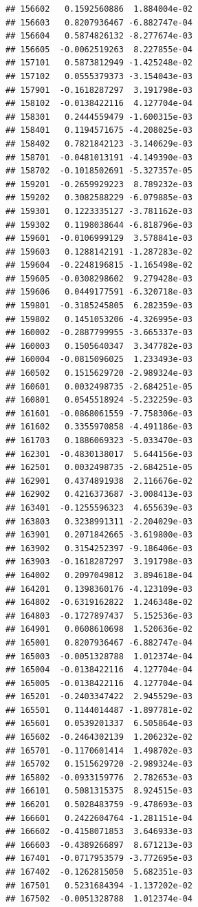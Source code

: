 \begin{frame}[fragile]
\begin{verbatim}
## 156602   0.1592560886  1.884004e-02
## 156603   0.8207936467 -6.882747e-04
## 156604   0.5874826132 -8.277674e-03
## 156605  -0.0062519263  8.227855e-04
## 157101   0.5873812949 -1.425248e-02
## 157102   0.0555379373 -3.154043e-03
## 157901  -0.1618287297  3.191798e-03
## 158102  -0.0138422116  4.127704e-04
## 158301   0.2444559479 -1.600315e-03
## 158401   0.1194571675 -4.208025e-03
## 158402   0.7821842123 -3.140629e-03
## 158701  -0.0481013191 -4.149390e-03
## 158702  -0.1018502691 -5.327357e-05
## 159201  -0.2659929223  8.789232e-03
## 159202   0.3082588229 -6.079885e-03
## 159301   0.1223335127 -3.781162e-03
## 159302   0.1198038644 -6.818796e-03
## 159601  -0.0106999129  3.578841e-03
## 159603   0.1288142191 -1.287283e-02
## 159604  -0.2248196815 -1.165498e-02
## 159605  -0.0308298602  9.279428e-03
## 159606   0.0449177591 -6.320718e-03
## 159801  -0.3185245805  6.282359e-03
## 159802   0.1451053206 -4.326995e-03
## 160002  -0.2887799955 -3.665337e-03
## 160003   0.1505640347  3.347782e-03
## 160004  -0.0815096025  1.233493e-03
## 160502   0.1515629720 -2.989324e-03
## 160601   0.0032498735 -2.684251e-05
## 160801   0.0545518924 -5.232259e-03
## 161601  -0.0868061559 -7.758306e-03
## 161602   0.3355970858 -4.491186e-03
## 161703   0.1886069323 -5.033470e-03
## 162301  -0.4830138017  5.644156e-03
## 162501   0.0032498735 -2.684251e-05
## 162901   0.4374891938  2.116676e-02
## 162902   0.4216373687 -3.008413e-03
## 163401  -0.1255596323  4.655639e-03
## 163803   0.3238991311 -2.204029e-03
## 163901   0.2071842665 -3.619800e-03
## 163902   0.3154252397 -9.186406e-03
## 163903  -0.1618287297  3.191798e-03
## 164002   0.2097049812  3.894618e-04
## 164201   0.1398360176 -4.123109e-03
## 164802  -0.6319162822  1.246348e-02
## 164803  -0.1727897437  5.152536e-03
## 164901   0.0608610698  1.520636e-02
## 165001   0.8207936467 -6.882747e-04
## 165003  -0.0051328788  1.012374e-04
## 165004  -0.0138422116  4.127704e-04
## 165005  -0.0138422116  4.127704e-04
## 165201  -0.2403347422  2.945529e-03
## 165501   0.1144014487 -1.897781e-02
## 165601   0.0539201337  6.505864e-03
## 165602  -0.2464302139  1.206232e-02
## 165701  -0.1170601414  1.498702e-03
## 165702   0.1515629720 -2.989324e-03
## 165802  -0.0933159776  2.782653e-03
## 166101   0.5081315375  8.924515e-03
## 166201   0.5028483759 -9.478693e-03
## 166601   0.2422604764 -1.281151e-04
## 166602  -0.4158071853  3.646933e-03
## 166603  -0.4389266897  8.671213e-03
## 167401  -0.0717953579 -3.772695e-03
## 167402  -0.1262815050  5.682351e-03
## 167501   0.5231684394 -1.137202e-02
## 167502  -0.0051328788  1.012374e-04

\end{verbatim}
\end{frame}
